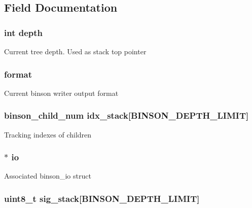 \subsection{Field Documentation}
\hypertarget{structbinson__writer___acb5ba97551079e0b072c62c21d784ac5}{
\subsubsection[{depth}]{\setlength{\rightskip}{0pt plus 5cm}int depth}}\label{structbinson__writer___acb5ba97551079e0b072c62c21d784ac5}
Current tree depth. Used as stack top pointer \hypertarget{structbinson__writer___aa87af0e0c359af37c271ef50cd1bc98b}{
\subsubsection[{format}]{ format}}\label{structbinson__writer___aa87af0e0c359af37c271ef50cd1bc98b}
Current binson writer output format \hypertarget{structbinson__writer___a9b3c4e8a83f930a2cb63002e26dc23b2}{
\subsubsection[{idx\-\_\-stack}]{\setlength{\rightskip}{0pt plus 5cm}binson\-\_\-child\-\_\-num idx\-\_\-stack\mbox{[}B\-I\-N\-S\-O\-N\-\_\-\-D\-E\-P\-T\-H\-\_\-\-L\-I\-M\-I\-T\mbox{]}}}\label{structbinson__writer___a9b3c4e8a83f930a2cb63002e26dc23b2}
Tracking indexes of children \hypertarget{structbinson__writer___ac3e1379fcb1bf00e4541f50350600022}{
\subsubsection[{io}]{$\ast$ io}}\label{structbinson__writer___ac3e1379fcb1bf00e4541f50350600022}
Associated {\ttfamily binson\-\_\-io} struct \hypertarget{structbinson__writer___a5bbe00e2514ebaac697f3f2f8755ddbe}{
\subsubsection[{sig\-\_\-stack}]{\setlength{\rightskip}{0pt plus 5cm}uint8\-\_\-t sig\-\_\-stack\mbox{[}B\-I\-N\-S\-O\-N\-\_\-\-D\-E\-P\-T\-H\-\_\-\-L\-I\-M\-I\-T\mbox{]}}}\label{structbinson__writer___a5bbe00e2514ebaac697f3f2f8755ddbe}
